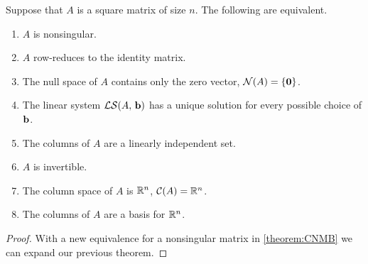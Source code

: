 \documentclass{ximera}
\begin{document}
\begin{theorem}

  Suppose that $A$ is a square matrix of size $n$.  The following are equivalent.
  \begin{enumerate}\item $A$ is nonsingular.
  \item $A$ row-reduces to the identity matrix.
  \item The null space of $A$ contains only the zero vector, $\mathcal{N}\!\left(A\right)=\left\{\mathbf{0}\right\}$.
  \item The linear system $\mathcal{LS}\!\left(A,\,\mathbf{b}\right)$ has a unique solution for every possible choice of $\mathbf{b}$.
  \item The columns of $A$ are a linearly independent set.
  \item $A$ is invertible.
  \item The column space of $A$ is $\mathbb{R}^{n}$, $\mathcal{C}\!\left(A\right)=\mathbb{R}^{n}$.
  \item The columns of $A$ are a basis for $\mathbb{R}^{n}$.
  \end{enumerate}

  \begin{proof}
    With a new equivalence for a nonsingular matrix in \ref{theorem:CNMB} we can expand our previous theorem.
  \end{proof}
\end{theorem}
\end{document}

